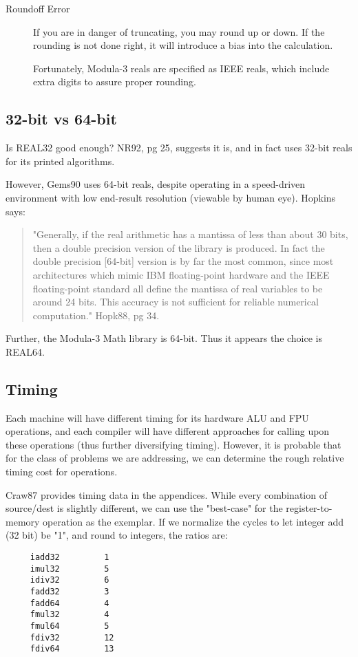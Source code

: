 \begin{description}
\item[Roundoff Error]
     If you are in danger of truncating, you may round up or
     down.  If the rounding is not done right, it will
     introduce a bias into the calculation.
     
     Fortunately, Modula-3 reals are specified as IEEE
     reals, which include extra digits to assure proper
     rounding.
\end{description}

\subsection{32-bit vs 64-bit}
Is REAL32 good enough?  NR92, pg 25, suggests it is, and in
fact uses 32-bit reals for its printed algorithms.

However, Gems90 uses 64-bit reals, despite operating in a
speed-driven environment with low end-result resolution
(viewable by human eye).  Hopkins says:
\begin{quote}
     "Generally, if the real arithmetic has a mantissa of
     less than about 30 bits, then a double precision
     version of the library is produced.  In fact the double
     precision [64-bit] version is by far the most common,
     since most architectures which mimic IBM floating-point
     hardware and the IEEE floating-point standard all
     define the mantissa of real variables to be around 24
     bits.  This accuracy is not sufficient for reliable
     numerical computation."  Hopk88, pg 34.
\end{quote}

Further, the Modula-3 Math library is 64-bit.  Thus it
appears the choice is REAL64.

\subsection{Timing}
Each machine will have different timing for its hardware
ALU and FPU operations, and each compiler will have
different approaches for calling upon these operations (thus
further diversifying timing).  However, it is probable that
for the class of problems we are addressing, we can
determine the rough relative timing cost for operations.

Craw87 provides timing data in the appendices.  While every
combination of source/dest is slightly different, we can use
the "best-case" for the register-to-memory operation as the
exemplar.  If we normalize the cycles to let integer add (32
bit) be "1", and round to integers, the ratios are:
\begin{verbatim}
     iadd32         1
     imul32         5
     idiv32         6
     fadd32         3
     fadd64         4
     fmul32         4
     fmul64         5
     fdiv32         12
     fdiv64         13
\end{verbatim}

